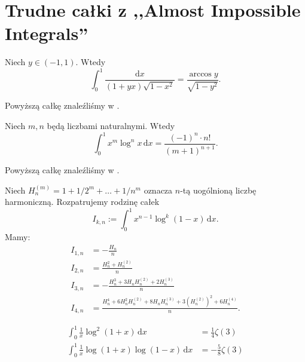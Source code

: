 \section{Trudne całki z ,,Almost Impossible Integrals''}
\begin{problem}
    Niech $y \in (-1, 1)$.
    Wtedy
    \begin{equation}
        \int_0^1 \frac{\mathrm{d}x}{(1+yx) \sqrt{1-x^2}} = \frac{\arccos y}{\sqrt{1-y^2}}.
    \end{equation}
\end{problem}

Powyższą całkę znaleźliśmy w \cite[s. 1]{valean}.

\begin{problem}
    Niech $m, n$ będą liczbami naturalnymi.
    Wtedy
    \begin{equation}
        \int_0^1 x^m \log^n x \,\mathrm{d} x = \frac{(-1)^n \cdot n!}{(m+1)^{n+1}}.
    \end{equation}
\end{problem}

Powyższą całkę znaleźliśmy w \cite[s. 1]{valean}.

\begin{problem}
    Niech $H_{n}^{(m)} = 1 + 1/2^m + \ldots + 1/n^m$ oznacza $n$-tą uogólnioną liczbę harmoniczną.
    Rozpatrujemy rodzinę całek
    \begin{equation}
        I_{k,n} := \int_0^1 x^{n-1} \log^k (1-x) \,\mathrm{d} x.
    \end{equation}
    Mamy:
    \begin{align}
        I_{1,n} & = - \frac{H_n}{n} \\
        I_{2,n} & = \frac{H_n^2 + H_n^{(2)}}{n} \\
        I_{3,n} & = - \frac{H_n^3 + 3H_nH_n^{(2)} + 2H_n^{(3)}}{n} \\
        I_{4,n} & = \frac{H_n^4 + 6H_n^2 H_n^{(2)} + 8H_nH_n^{(3)} + 3(H_n^{(2)})^2 + 6H_n^{(4)}}{n}.
    \end{align}
\end{problem}


\begin{problem}
    \begin{align}
        \int_0^1 \frac{1}{x} \log^2 (1+x) \,\mathrm{d}x & = \frac{1}{4} \zeta(3) \\
        \int_0^1 \frac{1}{x} \log (1+x) \log (1-x) \,\mathrm{d}x & = -\frac{5}{8} \zeta(3)
    \end{align}
\end{problem}


